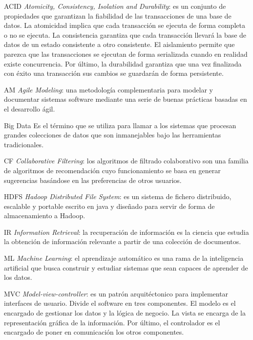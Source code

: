 
\renewcommand*{\arraystretch}{1.5}
\begin{description}
\item{ACID} \textit{Atomicity, Consistency, Isolation and Durability}: es un conjunto de propiedades que garantizan la fiabilidad de las transacciones de una base de datos. La atomicidad implica que cada transacción se ejecuta de forma completa o no se ejecuta. La consistencia garantiza que cada transacción llevará la base de datos de un estado consistente a otro consistente. El aislamiento permite que parezca que las transacciones se ejecutan de forma serializada cuando en realidad existe concurrencia. Por último, la durabilidad garantiza que una vez finalizada con éxito una transacción sus cambios se guardarán de forma persistente.

\item{AM} \textit{Agile Modeling}: una metodología complementaria para modelar y documentar sistemas software mediante una serie de buenas prácticas basadas en el desarrollo ágil.

\item {Big Data} Es el término que se utiliza para llamar a los sistemas que procesan grandes colecciones de datos que son inmanejables bajo las herramientas tradicionales.

\item{CF} \textit{Collaborative Filtering}: los algoritmos de filtrado colaborativo son una familia de algoritmos de recomendación cuyo funcionamiento se basa en generar sugerencias basándose en las preferencias de otros usuarios.

\item{HDFS} \textit{Hadoop Distributed File System}: es un sistema de fichero distribuido, escalable y portable escrito en java y diseñado para servir de forma de almacenamiento a Hadoop.

\item{IR} \textit{Information Retrieval}: la recuperación de información es la ciencia que estudia la obtención de información relevante a partir de una colección de documentos.

\item{ML} \textit{Machine Learning}: el aprendizaje automático es una rama de la inteligencia artificial que busca construir y estudiar sistemas que sean capaces de aprender de los datos.

\item{MVC} \textit{Model-view-controller}: es un patrón arquitéctonico para implementar interfaces de usuario. Divide el software en tres componentes. El modelo es el encargado de gestionar los datos y la lógica de negocio. La vista se encarga de la representación gráfica de la información. Por último, el controlador es el encargado de poner en comunicación los otros componentes.


\end{description}
